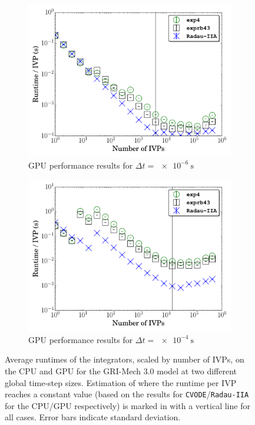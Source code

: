 \documentclass[preprint,review,11pt]{elsarticle}
\begin{document}
\begin{figure}[htbp]
\begin{subfigure}{0.49\textwidth}
      \includegraphics[width=\linewidth]{CH4_1e-06_gpu.pdf}
      \caption{GPU performance results for $\Delta t = \SI{e-6}{\second}$}
      \label{F:ch4_gpu_perf_small}
  \end{subfigure}
  \begin{subfigure}{0.49\textwidth}
      \includegraphics[width=\linewidth]{CH4_1e-04_gpu.pdf}
      \caption{GPU performance results for $\Delta t = \SI{e-4}{\second}$}
      \label{F:ch4_gpu_perf_large}
  \end{subfigure}
  \caption{Average runtimes of the integrators, scaled by number of IVPs, on the CPU and GPU for the GRI-Mech 3.0 model at two different global time-step sizes.
  Estimation of where the runtime per IVP reaches a constant value (based on the results for \texttt{CVODE}\slash\texttt{Radau-IIA} for the CPU\slash GPU respectively) is marked in with a vertical line for all cases.
  Error bars indicate standard deviation.}
  \label{F:CH4_perf}
\end{figure}
\end{document}
